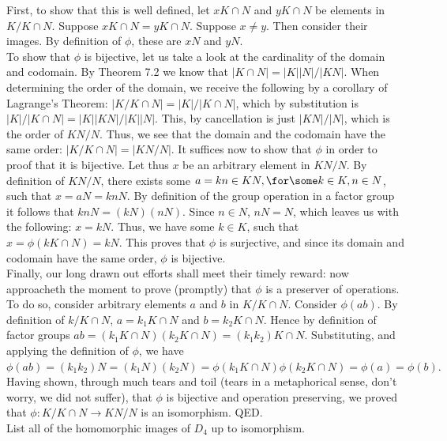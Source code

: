 \documentclass{article}
\begin{document}
First, to show that this is well defined, let $xK\cap N$ and $yK\cap N$ be elements in $K/K\cap N$. Suppose  $xK\cap N  = yK\cap N$. Suppose $x\ne y$. Then  consider their images. By definition of $\phi$, these are $xN$ and $yN$. \\

To show that $\phi$ is bijective, let us take a look at the cardinality of the domain and codomain. By Theorem 7.2 we know that $|K \cap N|=|K||N|/|KN|$. When determining the order of the domain, we receive the following by a corollary of Lagrange's Theorem: $|K/ K \cap N|=|K|/|K \cap N|$, which by substitution is $|K|/|K \cap N|=|K||KN|/|K||N|$. This, by cancellation is just $|KN|/|N|$, which is the order of $KN/N$. Thus, we see that the domain and the codomain have the same order: $|K/K \cap N|=|KN/N|$. It suffices now to show that $\phi$ in order to proof that it is bijective. Let thus $x$ be an arbitrary element in $KN/N$. By definition of $KN/N$, there exists some $a=kn \in KN, \for \some k \in K, n \in N$, such that $x=aN=knN$. By definition of the group operation in a factor group it follows that $knN=(kN)(nN)$. Since $n \in N$, $nN=N$, which leaves us with the following: $x=kN$. Thus, we have some $k \in K$, such that $x=\phi(kK \cap N)=kN$. This proves that $\phi$ is surjective, and since its domain and codomain have the same order, $\phi$ is bijective.\\

Finally, our long drawn out efforts shall meet their timely reward: now approacheth the moment to prove (promptly) that $\phi$ is a preserver of operations. To do so, consider arbitrary elements $a$ and $b$ in $K/K\cap N$. Consider $\phi(ab)$. By definition of $k/K\cap N$, $a = k_1K\cap N$ and $b = k_2 K\cap N$. Hence by definition of factor groups $ab = (k_1K\cap N)(k_2K\cap N) = (k_1k_2)K\cap N$. Substituting, and applying the definition of $\phi$, we have $\phi(ab) = (k_1k_2)N = (k_1N)(k_2N) = \phi(k_1K\cap N)\phi(k_2K\cap N) = \phi(a) = \phi(b).$\\

Having shown, through much tears and toil (tears in a metaphorical sense, don't worry, we did not suffer), that $\phi$ is bijective and operation preserving, we proved that $\phi: K/K \cap N \rightarrow KN/N$ is an isomorphism. QED.\\
\newpage
{} List all of the homomorphic images of $D_4$ up to isomorphism.\\
\end{document}
